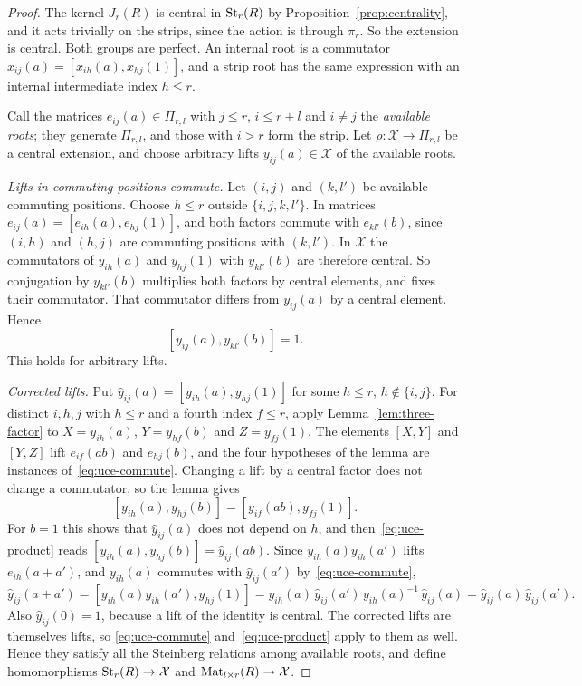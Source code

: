 \begin{proof}
The kernel $J_r(R)$ is central in $\operatorname{St}_r(R)$ by Proposition~\ref{prop:centrality}, and it acts trivially on the strips,
since the action is through $\pi_r$. So the extension is central. Both groups are perfect. An internal root is a
commutator $x_{ij}(a)=[x_{ih}(a),x_{hj}(1)]$, and a strip root has the same expression with an internal intermediate
index $h\leq r$.

Call the matrices $e_{ij}(a)\in\Pi_{r,l}$ with $j\leq r$, $i\leq r+l$ and $i\neq j$ the \emph{available roots};
they generate $\Pi_{r,l}$, and those with $i>r$ form the strip. Let $\rho\colon\mathcal X\to\Pi_{r,l}$ be a central
extension, and choose arbitrary lifts $y_{ij}(a)\in\mathcal X$ of the available roots.

\emph{Lifts in commuting positions commute.} Let $(i,j)$ and $(k,l')$ be available commuting positions. Choose $h\leq r$
outside $\{i,j,k,l'\}$. In matrices $e_{ij}(a)=[e_{ih}(a),e_{hj}(1)]$, and both factors commute with $e_{kl'}(b)$, since
$(i,h)$ and $(h,j)$ are commuting positions with $(k,l')$. In $\mathcal X$ the commutators of $y_{ih}(a)$ and $y_{hj}(1)$ with
$y_{kl'}(b)$ are therefore central. So conjugation by $y_{kl'}(b)$ multiplies both factors by central elements, and fixes
their commutator. That commutator differs from $y_{ij}(a)$ by a central element. Hence
\begin{equation}\label{eq:uce-commute}
 [y_{ij}(a),y_{kl'}(b)]=1.
\end{equation}
This holds for arbitrary lifts.

\emph{Corrected lifts.} Put $\hat y_{ij}(a)=[y_{ih}(a),y_{hj}(1)]$ for some $h\leq r$, $h\notin\{i,j\}$. For distinct
$i,h,j$ with $h\leq r$ and a fourth index $f\leq r$, apply Lemma~\ref{lem:three-factor} to $X=y_{ih}(a)$,
$Y=y_{hf}(b)$ and $Z=y_{fj}(1)$. The elements $[X,Y]$ and $[Y,Z]$ lift $e_{if}(ab)$ and $e_{hj}(b)$, and the four
hypotheses of the lemma are instances of~\eqref{eq:uce-commute}. Changing a lift by a central factor does not change a
commutator, so the lemma gives
\begin{equation}\label{eq:uce-product}
 [y_{ih}(a),y_{hj}(b)]=[y_{if}(ab),y_{fj}(1)].
\end{equation}
For $b=1$ this shows that $\hat y_{ij}(a)$ does not depend on $h$, and then~\eqref{eq:uce-product} reads
$[y_{ih}(a),y_{hj}(b)]=\hat y_{ij}(ab)$. Since $y_{ih}(a)y_{ih}(a')$ lifts $e_{ih}(a+a')$, and $y_{ih}(a)$ commutes with
$\hat y_{ij}(a')$ by~\eqref{eq:uce-commute},
\[
 \hat y_{ij}(a+a')=[y_{ih}(a)y_{ih}(a'),y_{hj}(1)]=y_{ih}(a)\,\hat y_{ij}(a')\,y_{ih}(a)^{-1}\,\hat y_{ij}(a)
 =\hat y_{ij}(a)\,\hat y_{ij}(a').
\]
Also $\hat y_{ij}(0)=1$, because a lift of the identity is central. The corrected lifts are themselves lifts, so
\eqref{eq:uce-commute} and~\eqref{eq:uce-product} apply to them as well. Hence they satisfy all the Steinberg relations
among available roots, and define homomorphisms $\operatorname{St}_r(R)\to\mathcal X$ and $\operatorname{Mat}_{l\times r}(R)\to\mathcal X$.


\end{proof}

